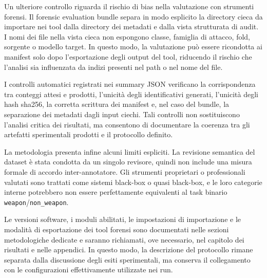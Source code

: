 Un ulteriore controllo riguarda il rischio di bias nella valutazione con
strumenti forensi. Il forensic evaluation bundle separa in modo esplicito la directory
cieca da importare nei tool dalla directory dei metadati e dalla vista
strutturata di audit. I nomi dei file nella vista cieca non espongono classe,
famiglia di attacco, fold, sorgente o modello target. In questo modo, la
valutazione può essere ricondotta ai manifest solo dopo l'esportazione degli
output del tool, riducendo il rischio che l'analisi sia influenzata da indizi
presenti nel path o nel nome del file.

I controlli automatici registrati nei summary JSON verificano la corrispondenza
tra conteggi attesi e prodotti, l'unicità degli identificativi generati,
l'unicità degli hash \gls{sha256}, la corretta scrittura dei manifest e, nel caso del
bundle, la separazione dei metadati dagli input ciechi. Tali controlli non sostituiscono
l'analisi critica dei risultati, ma consentono
di documentare la coerenza tra gli artefatti sperimentali prodotti e il
protocollo definito.

La metodologia presenta infine alcuni limiti espliciti. La revisione semantica
del dataset è stata condotta da un singolo revisore, quindi non include una
misura formale di accordo inter-annotatore. Gli strumenti proprietari o professionali
valutati sono trattati come sistemi
black-box o quasi black-box, e le loro categorie interne
potrebbero non essere perfettamente equivalenti al task binario
\texttt{weapon}/\texttt{non\_weapon}.

Le versioni software, i moduli abilitati, le impostazioni di importazione e le
modalità di esportazione dei tool forensi sono documentati nelle sezioni
metodologiche dedicate e saranno richiamati, ove necessario, nel capitolo dei
risultati e nelle appendici. In questo modo, la descrizione del protocollo rimane
separata dalla discussione degli esiti sperimentali, ma conserva il collegamento
con le configurazioni effettivamente utilizzate nei run.
